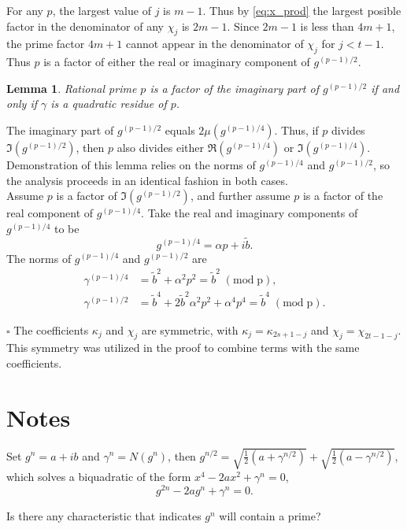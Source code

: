 \documentclass[oneside,english,man]{amsart}
\numberwithin{equation}{section}
\numberwithin{figure}{section}
\newtheorem{lemma}{Lemma}[theorem]
\begin{document}
For any $p$, the largest value of $j$ is $m-1$.  Thus by \eqref{eq:x_prod} the largest posible factor in the denominator of any $\chi_j$ is $2m-1$.  Since $2m-1$ is less than $4m+1$, the prime factor $4m+1$ cannot appear in the denominator of $\chi_j$ for $j<t-1$.  Thus $p$ is a factor of either the real or imaginary component of $g^{(p-1)/2}$.
\\

\begin{lemma}
Rational prime $p$ is a factor of the imaginary part of $g^{(p-1)/2}$ if and only if $\gamma$ is a quadratic residue of $p$.
\end{lemma}

The imaginary part of $g^{(p-1)/2}$ equals $2\mu\left(g^{(p-1)/4}\right)$. Thus, if $p$ divides $\Im\left(g^{(p-1)/2}\right)$, then $p$ also divides either $\Re\left(g^{(p-1)/4}\right)$ or $\Im\left(g^{(p-1)/4}\right)$.  Demonstration of this lemma relies on the norms of $g^{(p-1)/4}$ and $g^{(p-1)/2}$, so the analysis proceeds in an identical fashion in both cases.
\\

Assume $p$ is a factor of $\Im{\left(g^{(p-1)/2}\right)}$, and further assume $p$ is a factor of the real component of $g^{(p-1)/4}$.  Take the real and imaginary components of $g^{(p-1)/4}$ to be
\begin{equation*}
	g^{(p-1)/4} = \alpha p +i\tilde{b}.
\end{equation*}
The norms of $g^{(p-1)/4}$ and $g^{(p-1)/2}$ are
\begin{align}
	\gamma^{(p-1)/4}&=\tilde{b}^2+\alpha^2 p^2 =\tilde{b}^2\;(\mathrm{mod\;p}),\label{eq:p_1_quad} \\
	\gamma^{(p-1)/2}&=\tilde{b}^4+2\tilde{b}^2\alpha^2 p^2 + \alpha^4 p^4 = \tilde{b}^4\;(\mathrm{mod\;p}) \label{eq:p_1_quart}.
\end{align}


$\square$
The coefficients $\kappa_j$ and $\chi_j$ are symmetric, with $\kappa_j=\kappa_{2s+1-j}$ and $\chi_j=\chi_{2t-1-j}$.  This symmetry was utilized in the proof to combine terms with the same coefficients.



\section{Notes}


Set $g^n=a+ib$ and $\gamma^n=N(g^n)$, then $g^{n/2}=\sqrt{\frac{1}{2}(a+\gamma^{n/2})}+\sqrt{\frac{1}{2}(a-\gamma^{n/2})}$, which solves a biquadratic of the form $x^4-2ax^2+\gamma^n=0$,
\begin{equation}
	g^{2n}-2ag^n+\gamma^n=0.
\end{equation}

Is there any characteristic that indicates $g^n$ will contain a prime?
\end{document}
